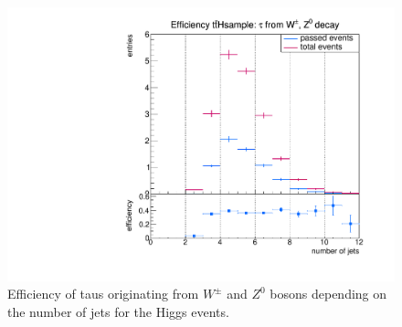 %
%
\begin{figure}
                \includegraphics[width=\textwidth]{figures/plots/ttH/Divided_promptnjets.pdf}
                \caption{Efficiency of taus originating from $W^\pm$ and $Z^0$ bosons depending on the number of jets for the Higgs events.}
         \label{Divided:prompt:njets}
\end{figure}
%
%
%

